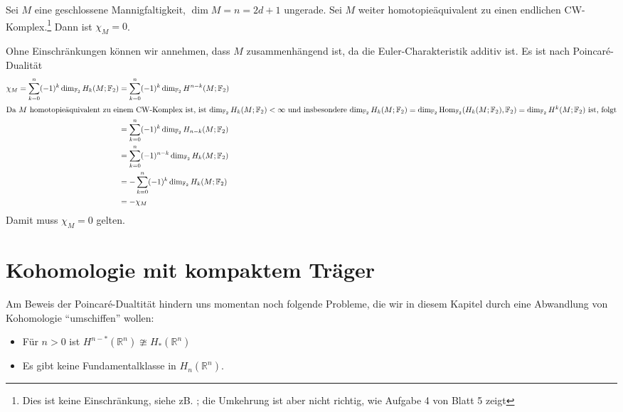 \begin{satz}[{name=[{Eulercharakteristik von Mannigfaltigkeiten ungerader Dimension}]}]
	Sei $M$ eine geschlossene Mannigfaltigkeit, $\dim M = n = 2d +1$ ungerade. 
	Sei $M$ weiter homotopieäquivalent zu einen endlichen CW-Komplex.\footnote{Dies ist keine Einschränkung, siehe zB. \cite[Cor. A.12]{Hatcher}; die Umkehrung ist aber nicht richtig, wie Aufgabe 4 von Blatt 5 zeigt} 
	Dann ist $\chi_M =0$.
\end{satz}
\begin{beweis}
	Ohne Einschränkungen können wir annehmen, dass $M$ zusammenhängend ist, da die Euler-Charakteristik additiv ist. Es ist nach Poincaré-Dualität 
	\begin{align}
		\chi_M = \sum_{k=0}^{n} (-1)^k \dim_{\mathbb{F}_2} H_k(M;\mathbb{F}_2) &= \sum_{k=0}^{n} (-1)^k \dim_{\mathbb{F}_2} H^{n-k}(M;\mathbb{F}_2) \\
		\intertext{Da $M$ homotopieäquivalent zu einem CW-Komplex ist, ist $\dim_{\mathbb{F}_2} H_k(M; \mathbb{F}_2)<\infty $ und insbesondere $\dim_{\mathbb{F}_2} H_k(M;\mathbb{F}_2) = \dim_{\mathbb{F}_2} \Hom_{\mathbb{F}_2} \enbrace*{H_k(M; \mathbb{F}_2),\mathbb{F}_2} = \dim_{\mathbb{F}_2} H^k(M; \mathbb{F}_2)$ ist, folgt}
		&= \sum_{k=0}^{n} (-1)^k \dim_{\mathbb{F}_2} H_{n-k}(M; \mathbb{F}_2) \\
		&= \sum_{k=0}^{n} (-1)^{n-k} \dim_{\mathbb{F}_2} H_k(M; \mathbb{F}_2) \\
		&= - \sum_{k=0}^{n} (-1)^k \dim_{\mathbb{F}_2} H_k(M;\mathbb{F}_2) \\
		&= - \chi_M
	\end{align}
	Damit muss $\chi_M = 0$ gelten.
\end{beweis}
\newpage

\section{Kohomologie mit kompaktem Träger} %
\label{sec:7}

\begin{bemerkung}[{name=[Probleme beim Beweis der Poincaré-Dualität]}]
	Am Beweis der Poincaré-Dualtität hindern uns momentan noch folgende Probleme, die wir in diesem Kapitel durch eine Abwandlung von Kohomologie \enquote{umschiffen} wollen: 
	\begin{itemize}[itemsep=0pt]
		\item Für $n>0$ ist  $H^{n-*}(\mathbb{R}^n) \ncong H_*(\mathbb{R}^n)$
		\item Es gibt keine Fundamentalklasse in $H_n(\mathbb{R}^n)$.
	\end{itemize}
\end{bemerkung}

